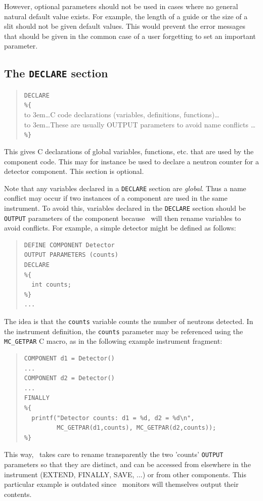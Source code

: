   However, optional parameters should not be used in cases where no general
  natural default value exists. For example, the length of a guide or the size
  of a slit should not be given default values. This would prevent the error
  messages that should be given in the common case of a user forgetting to set
  an important parameter.


\subsection{The \texttt{DECLARE} section}
\label{s:comp-declare}
\begin{quote}
  \texttt{DECLARE} \\
  \verb|%{| \\
  \hbox to 3em{}\ldots C code declarations (variables, definitions, functions)\ldots \\
  \hbox to 3em{}\ldots These are usually OUTPUT parameters to avoid name conflicts \ldots \\
  \verb|%}|
\end{quote}
 This gives C declarations of global variables,
functions, etc. that are used by the component code. This may for instance be
used to declare a neutron counter for a detector component. This section is
optional.

Note that any variables declared in a \verb+DECLARE+ section are
\emph{global}. Thus a name conflict may occur if two instances of a component
are used in the same instrument. To avoid this, variables declared in the
\texttt{DECLARE} section should be \texttt{OUTPUT} parameters of the component
because \MCS\ will then rename variables to avoid conflicts.  For example, a
simple detector might be defined as follows:
\begin{quote}
\begin{verbatim}
DEFINE COMPONENT Detector
OUTPUT PARAMETERS (counts)
DECLARE
%{
  int counts;
%}
...
\end{verbatim}
\end{quote}
  The idea
is that the \texttt{counts} variable counts the number of neutrons detected. In
the instrument definition, the \texttt{counts} parameter may be referenced using
the \verb+MC_GETPAR+ C macro, as in the following example instrument
fragment:\label{mcgetpar}
\begin{quote}
\begin{verbatim}
COMPONENT d1 = Detector()
...
COMPONENT d2 = Detector()
...
FINALLY
%{
  printf("Detector counts: d1 = %d, d2 = %d\n",
         MC_GETPAR(d1,counts), MC_GETPAR(d2,counts));
%}
\end{verbatim}
\end{quote}
This way, \MCS\ takes care to rename transparently the two 'counts'
\texttt{OUTPUT} parameters so that they are distinct, and can be accessed from
elsewhere in the instrument (EXTEND, FINALLY, SAVE, ...)  or from other
components. This particular example is outdated since \MCS\ monitors will
themselves output their contents.

